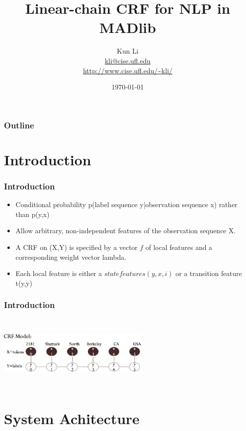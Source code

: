 \documentclass{beamer}
\title[RU style for Beamer]{
  Linear-chain CRF for NLP in MADlib}
\author[Kun Li]{
  Kun Li \\\medskip
  {\small \url{kli@cise.ufl.edu}} \\ 
  {\small \url{http://www.cise.ufl.edu/~kli/}}}
\institute[University of Florida]{
  Department of Computer \& Information Science \& Engineering\\
  University of Florida}
\date[slides Example 2010]{\today}
\begin{document}
\begin{frame}
  \titlepage
\end{frame}

\begin{frame}
  \frametitle{Outline}

  \tableofcontents
\end{frame}

\section{Introduction}

\begin{frame}
  \frametitle{Introduction}
  \begin{itemize}
    \item Conditional probability p(label sequence y|observation sequence x) rather than p(y,x)
    \item Allow arbitrary, non-independent features of the observation sequence X. 
    \item A CRF on (X,Y) is specified by a vector $f$ of local features and a corresponding weight vector
          lambda.
    \item Each local feature is either a $state feature s(y,x,i)$ or a transition feature t(y,y) 
  \end{itemize}
\end{frame}
\begin{frame}
  \frametitle{Introduction}
  \begin{center}
  \includegraphics[height=10em, width=20em]{crf.jpg}
  \end{center}
\end{frame}

\section{System Achitecture}
\end{document}
